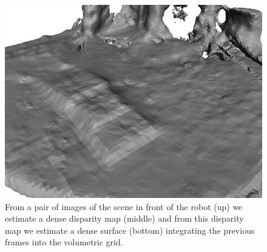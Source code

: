 \begin{figure}[h]
\vspace{0.2cm}
\includegraphics[scale=0.5]{Chap6-3D-Reconstruction/snapshot02}
\caption[]{From a pair of images of the scene in front of the robot
(up) we estimate a dense disparity map (middle) and from this
disparity map we estimate a dense surface (bottom) integrating the previous
frames into the volumetric grid.}
\label{Fig:Reconstruction1}
\end{figure}


